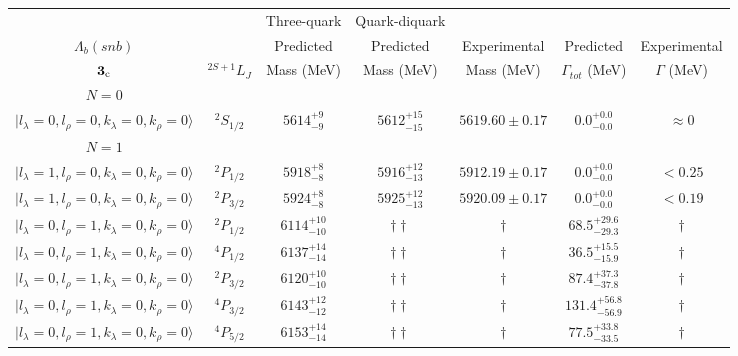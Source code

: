 \begin{tabular}{c c| c c c c c }\hline \hline
            &  & Three-quark &  Quark-diquark    &               &              &  \\ 
$\Lambda_{b}(snb)$&  & Predicted   &    Predicted   &  Experimental &  Predicted            & Experimental \\ 
${\bf {3}}_{\rm c}$  & $^{2S+1}L_{J}$ & Mass (MeV)  &   Mass (MeV)   &  Mass (MeV)   &  $\Gamma_{tot}$ (MeV) & $\Gamma$ (MeV) \\ \hline
\hline
 $N=0$  &  &  &  &  &  \\ 
$\vert l_{\lambda}\!\!=\!0, l_{\rho}\!\!=\!0, k_{\lambda}\!\!=\!0, k_{\rho}\!\!=\!0 \rangle$ & $^{2}S_{1/2}$ & $5614^{+9}_{-9}$ & $5612^{+15}_{-15}$ & $5619.60\pm 0.17$ & $0.0^{+0.0}_{-0.0}$ & $\approx 0$ \\ 
\hline
 $N=1$  &  &  &  &  &  \\ 
$\vert l_{\lambda}\!\!=\!1, l_{\rho}\!\!=\!0, k_{\lambda}\!\!=\!0, k_{\rho}\!\!=\!0 \rangle$ & $^{2}P_{1/2}$ & $5918^{+8}_{-8}$ & $5916^{+12}_{-13}$ & $5912.19\pm 0.17$ & $0.0^{+0.0}_{-0.0}$ & $<0.25$ \\ 
$\vert l_{\lambda}\!\!=\!1, l_{\rho}\!\!=\!0, k_{\lambda}\!\!=\!0, k_{\rho}\!\!=\!0 \rangle$ & $^{2}P_{3/2}$ & $5924^{+8}_{-8}$ & $5925^{+12}_{-13}$ & $5920.09\pm 0.17$ & $0.0^{+0.0}_{-0.0}$ & $<0.19$ \\ 
$\vert l_{\lambda}\!\!=\!0, l_{\rho}\!\!=\!1, k_{\lambda}\!\!=\!0, k_{\rho}\!\!=\!0 \rangle$ & $^{2}P_{1/2}$ & $6114^{+10}_{-10}$ & $\dagger\dagger$ & $\dagger$ & $68.5^{+29.6}_{-29.3}$ & $\dagger$ \\ 
$\vert l_{\lambda}\!\!=\!0, l_{\rho}\!\!=\!1, k_{\lambda}\!\!=\!0, k_{\rho}\!\!=\!0 \rangle$ & $^{4}P_{1/2}$ & $6137^{+14}_{-14}$ & $\dagger\dagger$ & $\dagger$ & $36.5^{+15.5}_{-15.9}$ & $\dagger$ \\ 
$\vert l_{\lambda}\!\!=\!0, l_{\rho}\!\!=\!1, k_{\lambda}\!\!=\!0, k_{\rho}\!\!=\!0 \rangle$ & $^{2}P_{3/2}$ & $6120^{+10}_{-10}$ & $\dagger\dagger$ & $\dagger$ & $87.4^{+37.3}_{-37.8}$ & $\dagger$ \\ 
$\vert l_{\lambda}\!\!=\!0, l_{\rho}\!\!=\!1, k_{\lambda}\!\!=\!0, k_{\rho}\!\!=\!0 \rangle$ & $^{4}P_{3/2}$ & $6143^{+12}_{-12}$ & $\dagger\dagger$ & $\dagger$ & $131.4^{+56.8}_{-56.9}$ & $\dagger$ \\ 
$\vert l_{\lambda}\!\!=\!0, l_{\rho}\!\!=\!1, k_{\lambda}\!\!=\!0, k_{\rho}\!\!=\!0 \rangle$ & $^{4}P_{5/2}$ & $6153^{+14}_{-14}$ & $\dagger\dagger$ & $\dagger$ & $77.5^{+33.8}_{-33.5}$ & $\dagger$ \\ 

\end{tabular}
